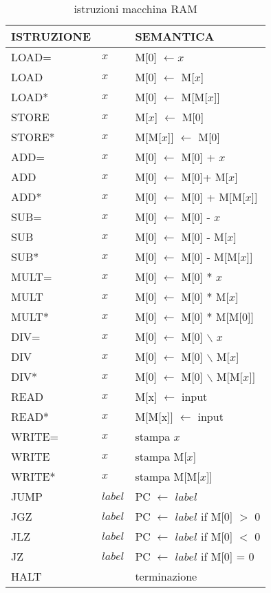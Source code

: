   \begin{table}[!htb] \label{tabella istruzioni RAM}
    \caption{istruzioni macchina RAM}
    \vspace*{10pt}
    
    \centering
    \begin{tabular}{l l | l}
      ISTRUZIONE & & SEMANTICA\\
      \hline
      LOAD= & \(x\) & M[0] \(\leftarrow x\)\\
      LOAD & \(x\)  & M[0] \(\leftarrow\) M[\(x\)]\\
      LOAD* & \(x\) & M[0] \(\leftarrow\) M[M[\(x\)]]\\
      STORE & \(x\) & M[\(x\)] \(\leftarrow\) M[0]\\
      STORE* & \(x\) & M[M[\(x\)]] \(\leftarrow\) M[0]\\
      ADD= & \(x\) & M[0] \(\leftarrow\) M[0] + \(x\)\\
      ADD  & \(x\)& M[0] \(\leftarrow\) M[0]+ M[\(x\)]\\
      ADD* & \(x\)& M[0] \(\leftarrow\) M[0] + M[M[\(x\)]]\\
      SUB= & \(x\)& M[0] \(\leftarrow\) M[0] - \(x\)\\
      SUB & \(x\)& M[0] \(\leftarrow\) M[0] - M[\(x\)]\\
      SUB* & \(x\)& M[0] \(\leftarrow\) M[0] - M[M[\(x\)]]\\
      MULT= & \(x\)& M[0] \(\leftarrow\) M[0] * \(x\)\\
      MULT & \(x\)& M[0] \(\leftarrow\) M[0] * M[\(x\)]\\
      MULT* & \(x\)& M[0] \(\leftarrow\) M[0] * M[M[0]]\\
      DIV= & \(x\)& M[0] \(\leftarrow\) M[0] \(\backslash\) \(x\) \\
      DIV & \(x\)& M[0] \(\leftarrow\) M[0] \(\backslash\) M[\(x\)]\\
      DIV* & \(x\)& M[0] \(\leftarrow\) M[0] \(\backslash\) M[M[\(x\)]]\\
      READ & \(x\)& M[x] \(\leftarrow\) input\\
      READ* & \(x\)& M[M[x]] \(\leftarrow\) input\\
      WRITE= & \(x\)& stampa \(x\)\\
      WRITE & \(x\)& stampa M[\(x\)]\\
      WRITE* & \(x\)& stampa M[M[\(x\)]]\\
      JUMP & \(label\)& PC \(\leftarrow\) \(label\) \\
      JGZ & \(label\)& PC \(\leftarrow\) \(label\) if M[0] \(>\) 0\\
      JLZ & \(label\)& PC \(\leftarrow\) \(label\) if M[0] \(<\) 0 \\
      JZ & \(label\)& PC \(\leftarrow\) \(label\) if M[0] = 0\\
      HALT & & terminazione\\
    \end{tabular}
  \end{table}

